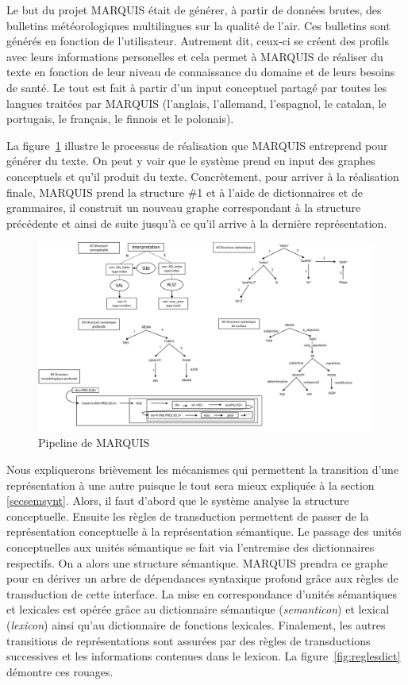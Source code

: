 Le but du projet MARQUIS était de générer, à partir de données brutes, des bulletins météorologiques multilingues sur la qualité de l'air. Ces bulletins sont générés en fonction de l'utilisateur. Autrement dit, ceux-ci se créent des profils avec leurs informations personelles et cela permet à MARQUIS de réaliser du texte en fonction de leur niveau de connaissance du domaine et de leurs besoins de santé. Le tout est fait à partir d'un input conceptuel partagé par toutes les langues traitées par MARQUIS (l'anglais, l'allemand, l'espagnol, le catalan, le portugais, le français, le finnois et le polonais). 

La figure~\ref{fig:marquis} illustre le processus de réalisation que MARQUIS entreprend pour générer du texte. On peut y voir que le système prend en input des graphes conceptuels et qu'il produit du texte. Concrètement, pour arriver à la réalisation finale, MARQUIS prend la structure \#1 et à l'aide de dictionnaires et de grammaires, il construit un nouveau graphe correspondant à la structure précédente et ainsi de suite jusqu'à ce qu'il arrive à la dernière représentation. 

\begin{figure}[htb]
	\centering
	\includegraphics[width=1\textwidth, trim = {0cm 0cm 0cm 0cm},clip]{ch2/figs/marquis.pdf}
	\caption{Pipeline de MARQUIS}
	\label{fig:marquis}
\end{figure}

Nous expliquerons brièvement les mécanismes qui permettent la transition d'une représentation à une autre puisque le tout sera mieux expliquée à la section \ref{secsemsynt}. Alors, il faut d'abord que le système analyse la structure conceptuelle. Ensuite les règles de transduction permettent de passer de la représentation conceptuelle à la représentation sémantique. Le passage des unités conceptuelles aux unités sémantique se fait via l'entremise des dictionnaires respectifs. On a alors une structure sémantique. MARQUIS prendra ce graphe pour en dériver un arbre de dépendances syntaxique profond grâce aux règles de transduction de cette interface. La mise en correspondance d'unités sémantiques et lexicales est opérée grâce au dictionnaire sémantique (\emph{semanticon}) et lexical (\emph{lexicon}) ainsi qu'au dictionnaire de fonctions lexicales. Finalement, les autres transitions de représentations sont assurées par des règles de transductions successives et les informations contenues dans le lexicon. La figure~\ref{fig:reglesdict} démontre ces rouages.

